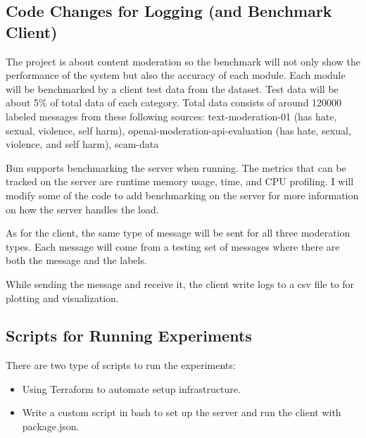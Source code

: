 \documentclass[
	english,
	accentcolor=9c,
	type=intern,
	marginpar=false,
	11pt
]{tudapub}
\begin{document}
\subsection{Code Changes for Logging (and Benchmark Client)}
\label{code-change}
The project is about content moderation so the benchmark will not only show the performance of the system but also the accuracy of each module.
Each module will be benchmarked by a client test data from the dataset.
Test data will be about 5\% of total data of each category.
Total data consists of around 120000 labeled messages from these following sources: text-moderation-01 (has hate, sexual, violence, self harm)\cite{text-moderation-01}, openai-moderation-api-evaluation (has hate, sexual, violence, and self harm)\cite{openai-moderation-api-evaluation}, scam-data\cite{scam-data}

Bun supports benchmarking the server when running.
The metrics that can be tracked on the server are runtime memory usage, time, and CPU profiling.
I will modify some of the code to add benchmarking on the server for more information on how the server handles the load.

As for the client, the same type of message will be sent for all three moderation types.
Each message will come from a testing set of messages where there are both the message and the labels.

While sending the message and receive it, the client write logs to a csv file to for plotting and visualization.
\subsection{Scripts for Running Experiments}
There are two type of scripts to run the experiments:
\begin{itemize}
    \item Using Terraform to automate setup infrastructure.
    \item Write a custom script in bash to set up the server and run the client with package.json.
\end{itemize}
\end{document}
